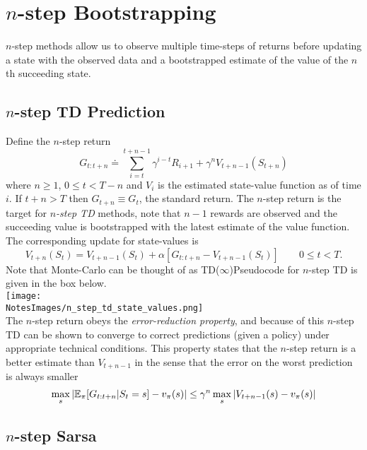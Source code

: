\section{$n$-step Bootstrapping}
$n$-step methods allow us to observe multiple time-steps of returns before updating a state with the observed data and a bootstrapped estimate of the value of the $n$th succeeding state.

\subsection{$n$-step TD Prediction}
Define the $n$-step return
\begin{equation}
    G_{t:t+n} \doteq \sum_{i=t}^{t+n-1}\gamma^{i-t}R_{i+1} + \gamma^n V_{t+n-1}(S_{t+n})
\end{equation}
where $n \geq 1$, $0 \leq t < T - n$ and $V_i$ is the estimated state-value function as of time $i$. If $t + n > T$ then $G_{t+n} \equiv G_t$, the standard return. The $n$-step return is the target for \emph{$n$-step TD} methods, note that $n-1$ rewards are observed and the succeeding value is bootstrapped with the latest estimate of the value function. The corresponding update for state-values is
\begin{equation}
    V_{t+n}(S_t) = V_{t+n - 1}(S_t) + \alpha [G_{t:t+n} - V_{t+n-1}(S_{t})]  \quad\quad 0 \leq t < T.
\end{equation}
Note that Monte-Carlo can be thought of as TD($\infty$)Pseudocode for $n$-step TD is given in the box below.\\

\texttt{[image: \\NotesImages/n\_step\_td\_state\_values.png]}\\

The $n$-step return obeys the \emph{error-reduction property}, and because of this $n$-step TD can be shown to converge to correct predictions (given a policy) under appropriate technical conditions. This property states that the $n$-step return is a better estimate than $V_{t+n-1}$ in the sense that the error on the worst prediction is always smaller
\begin{equation}
    \max_s \left|\mathbb{E}_{\pi}[G_{t:t+n}|S_t=s] - v_\pi(s)\right| \leq \gamma^n \max_s \left|V_{t+n-1}(s) - v_\pi(s)\right|
\end{equation}

\subsection{$n$-step Sarsa}
